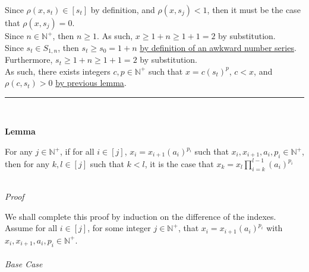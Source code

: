 \documentclass[a4paper,12pt]{article}
\begin{document}
\noindent Since $\rho(x, s_t) \in [s_t]$ by definition, and $\rho(x, s_j) < 1$, then it must be the case that $\rho(x, s_j) = 0$.\\

\noindent Since $n \in \mathbb{N}^+$, then $n \geq 1$. As such, $x \geq 1 + n \geq 1 + 1 = 2$ by substitution.\\

\noindent Since $s_t \in S_{1, n}$, then $s_t \geq s_0 = 1 + n$ \hyperlink{definition:awkward_number_series}{by definition of an awkward number series}.\\

\noindent Furthermore, $s_t \geq 1 + n \geq 1 + 1 = 2$ by substitution.\\

\noindent As such, there exists integers $c, p \in \mathbb{N}^+$ such that $x = c(s_t)^p$, $c < x$, and $\rho(c, s_t) > 0$ \hyperlink{lemma:remainder_powers}{by previous lemma}.

\begin{center}
\noindent\rule{8cm}{0.4pt}
\end{center}
\noindent \\









\label{lemma:closed_form_of_factorization}
\hypertarget{lemma:closed_form_of_factorization}{}
\begin{tcolorbox}
\textbf{Lemma}

For any $j \in \mathbb{N}^+$, if for all $i \in [j]$, $x_i = x_{i + 1}(a_i)^{p_i}$ such that $x_i, x_{i + 1}, a_i, p_i \in \mathbb{N}^+$, then for any $k, l \in [j]$ such that $k < l$, it is the case that $\displaystyle x_k = x_l \prod_{i = k}^{l - 1} (a_i)^{p_i}$
\end{tcolorbox}

\noindent\\
\textit{Proof}

\noindent We shall complete this proof by induction on the difference of the indexes.\\

\noindent Assume for all $i \in [j]$, for some integer $j \in \mathbb{N}^+$, that $x_i = x_{i + 1}(a_i)^{p_i}$ with $x_i, x_{i + 1}, a_i, p_i \in \mathbb{N}^+$.\\

\noindent\\
\textit{Base Case}
\end{document}
